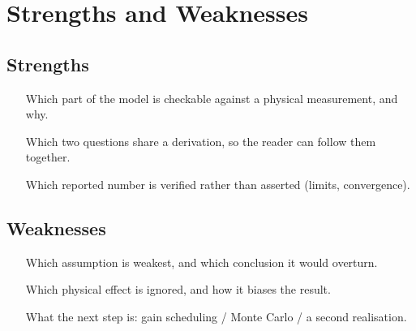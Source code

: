 \section{Strengths and Weaknesses}

\subsection{Strengths}
\begin{enumerate}
  \item [Which part of the model is checkable against a physical measurement, and why.]
  \item [Which two questions share a derivation, so the reader can follow them together.]
  \item [Which reported number is verified rather than asserted (limits, convergence).]
\end{enumerate}

\subsection{Weaknesses}
\begin{enumerate}
  \item [Which assumption is weakest, and which conclusion it would overturn.]
  \item [Which physical effect is ignored, and how it biases the result.]
  \item [What the next step is: gain scheduling / Monte Carlo / a second realisation.]
\end{enumerate}

